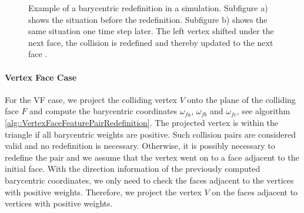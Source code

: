 \begin{figure}[h!] 
\begin{minipage}[b]{0.5 \linewidth}
		\centering
	\end{minipage}
	\begin{minipage}[b]{0.5 \linewidth}
		\centering
	\end{minipage}

  \caption[Example of a barycentric redefinition in a simulation.]{Example of a barycentric redefinition in a simulation. Subfigure a) shows the situation before the redefinition. Subfigure b) shows the same situation one time step later. The left vertex shifted under the next face, the collision is redefined and thereby updated to the next face .}
  \label{fig::svf_redef}
\end{figure}

\paragraph{Vertex Face Case}
For the VF case, we project the colliding vertex $V$ onto the plane of the colliding face $F$ and compute the barycentric coordinates $\omega_{fa}$, $\omega_{fb}$ and $\omega_{fc}$, see algorithm \ref{alg::VertexFaceFeaturePairRedefinition}.
The projected vertex is within the triangle if all barycentric weights are positive. Such collision pairs are considered valid and no redefinition is necessary.
Otherwise, it is possibly necessary to redefine the pair and we assume that the vertex went on to a face adjacent to the initial face.
With the direction information of the previously computed barycentric coordinates, we only need to check the faces adjacent to the vertices with positive weights.
Therefore, we project the vertex $V$ on the faces adjacent to vertices with positive weights.
 
